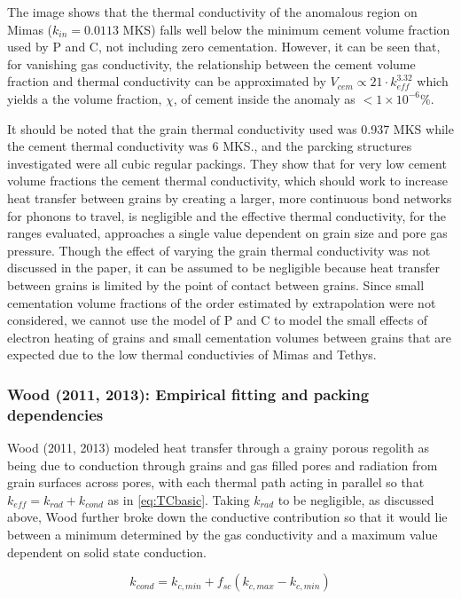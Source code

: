 \documentclass[11pt]{article} %
\begin{document}
\begin{itemize}
	The image shows that the thermal conductivity of the anomalous region on Mimas ($k_{in} = 0.0113$ MKS) falls well below the minimum cement volume fraction used by P and C, not including zero cementation. However, it can be seen that, for vanishing gas conductivity,  the relationship between the cement volume fraction and thermal conductivity can be approximated by $V_{cem} \varpropto 21\cdot k_{eff}^{3.32}$ which yields a the volume fraction, $\chi$, of cement inside the anomaly as $<1\times10^{-6} \%$.
	
	It should be noted that the grain thermal conductivity used was 0.937 MKS while the cement thermal conductivity was 6 MKS., and the parcking structures investigated were all cubic regular packings. They show that for very low cement volume fractions the cement thermal conductivity, which should work to increase heat transfer between grains by creating a larger, more continuous bond networks for phonons to travel, is negligible and the effective thermal conductivity, for the ranges evaluated, approaches a single value dependent on grain size and pore gas pressure. Though the effect of varying the grain thermal conductivity was not discussed in the paper, it can be assumed to be negligible because heat transfer between grains is limited by the point of contact between grains. Since small cementation volume fractions of the order estimated by extrapolation were not considered, we cannot use the model of P and C to model the small effects of electron heating of grains and small cementation volumes between grains that are expected due to the low thermal conductivies of Mimas and Tethys. 

\subsubsection{Wood (2011, 2013): Empirical fitting and packing dependencies}
	 Wood (2011, 2013) modeled heat transfer through a grainy porous regolith as being due to conduction through grains and gas filled pores and radiation from grain surfaces across pores, with each thermal path acting in parallel so that $k_{eff} = k_{rad} + k_{cond}$ as in \ref{eq:TCbasic}. Taking $k_{rad}$ to be negligible, as discussed above, Wood further broke down the conductive contribution so that it would lie between a minimum determined by the gas conductivity and a maximum value dependent on solid state conduction.
	
	\begin{equation}
	k_{cond} = k_{c,min} +f_{sc}(k_{c,max}-k_{c,min})
	\end{equation}
	

\end{itemize}
\end{document}
